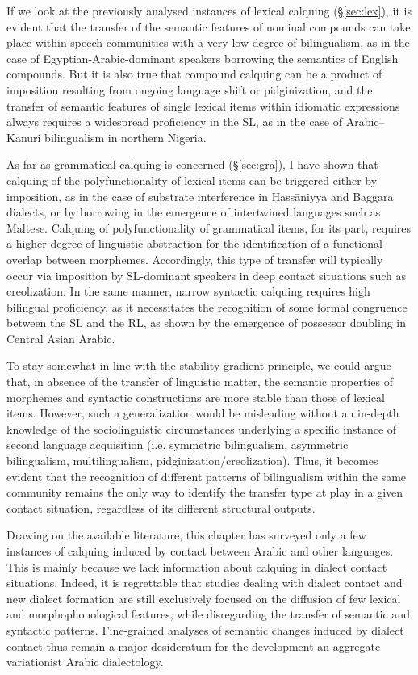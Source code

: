 \documentclass[output=paper]{langsci/langscibook}
\begin{document}
If we look at the previously analysed instances of lexical calquing (§\ref{sec:lex}), it is evident that the transfer of the semantic features of nominal compounds can take place within speech communities with a very low degree of bilingualism, as in the case of Egyptian-Arabic-dominant speakers borrowing the semantics of English compounds. But it is also true that compound calquing can be a product of imposition resulting from ongoing language shift or pidginization, and the transfer of semantic features of single lexical items within idiomatic expressions always requires a widespread proficiency in the SL, as in the case of Arabic–Kanuri bilingualism in northern Nigeria. 

As far as grammatical calquing is concerned (§\ref{sec:gra}), I have shown that calquing of the polyfunctionality of lexical items can be triggered either by imposition, as in the case of substrate interference in Ḥass\-āniyya and Baggara dialects, or by borrowing in the emergence of intertwined languages such as Maltese. Calquing of polyfunctionality of grammatical items, for its part, requires a higher degree of linguistic abstraction for the identification of a functional overlap between morphemes. Accordingly, this type of transfer will typically occur via imposition by SL-dominant speakers in deep contact situations such as creolization. In the same manner, narrow syntactic calquing requires high bilingual proficiency, as it necessitates the recognition of some formal congruence between the SL and the RL, as shown by the emergence of possessor doubling in Central Asian Arabic.  

To stay somewhat in line with the stability gradient principle, we could argue that, in absence of the transfer of linguistic matter, the semantic properties of morphemes and syntactic constructions are more stable than those of lexical items. However, such a generalization would be misleading without an in-depth knowledge of the sociolinguistic circumstances underlying a specific instance of second language acquisition (i.e. symmetric bilingualism, asymmetric bilingualism, multilingualism, pidginization/creolization). Thus, it becomes evident that the recognition of different patterns of bilingualism within the same community remains the only way to identify the transfer type at play in a given contact situation, regardless of its different structural outputs.  

Drawing on the available literature, this chapter has surveyed only a few instances of  calquing induced by contact between Arabic and other languages. This is mainly because we lack information about calquing in dialect contact situations. Indeed, it is regrettable that studies dealing with dialect contact and new dialect formation are still exclusively focused on the diffusion of few lexical and morphophonological features, while disregarding the transfer of semantic and syntactic patterns. Fine-grained analyses of semantic changes induced by dialect contact thus remain a major desideratum for the development an aggregate variationist Arabic dialectology.  
\end{document}
